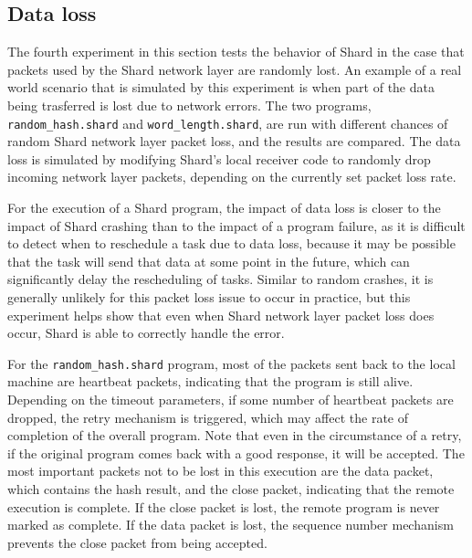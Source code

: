 \documentclass[twoside]{report}
\begin{document}
\subsection{Data loss}
The fourth experiment in this section tests the behavior of Shard in the case that packets used by the Shard network layer are randomly lost.
An example of a real world scenario that is simulated by this experiment is when part of the data being trasferred is lost due to network errors.
The two programs, \texttt{random\_hash.shard} and \texttt{word\_length.shard}, are run with different chances of random Shard network layer packet loss, and the results are compared.
The data loss is simulated by modifying Shard's local receiver code to randomly drop incoming network layer packets, depending on the currently set packet loss rate.

For the execution of a Shard program, the impact of data loss is closer to the impact of Shard crashing than to the impact of a program failure, as it is difficult to detect when to reschedule a task due to data loss, because it may be possible that the task will send that data at some point in the future, which can significantly delay the rescheduling of tasks.
Similar to random crashes, it is generally unlikely for this packet loss issue to occur in practice, but this experiment helps show that even when Shard network layer packet loss does occur, Shard is able to correctly handle the error.

For the \texttt{random\_hash.shard} program, most of the packets sent back to the local machine are heartbeat packets, indicating that the program is still alive.
Depending on the timeout parameters, if some number of heartbeat packets are dropped, the retry mechanism is triggered, which may affect the rate of completion of the overall program.
Note that even in the circumstance of a retry, if the original program comes back with a good response, it will be accepted.
The most important packets not to be lost in this execution are the data packet, which contains the hash result, and the close packet, indicating that the remote execution is complete.
If the close packet is lost, the remote program is never marked as complete.
If the data packet is lost, the sequence number mechanism prevents the close packet from being accepted.
\end{document}
